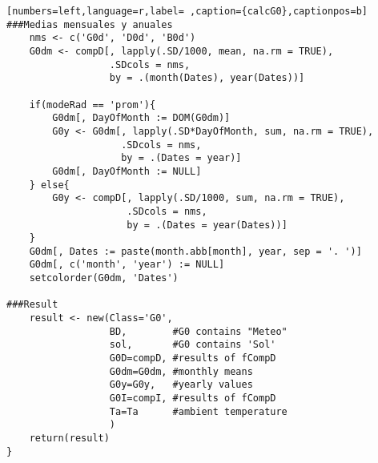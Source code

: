 \begin{lstlisting}[numbers=left,language=r,label= ,caption={calcG0},captionpos=b]
###Medias mensuales y anuales
    nms <- c('G0d', 'D0d', 'B0d')
    G0dm <- compD[, lapply(.SD/1000, mean, na.rm = TRUE),
                  .SDcols = nms,
                  by = .(month(Dates), year(Dates))]

    if(modeRad == 'prom'){
        G0dm[, DayOfMonth := DOM(G0dm)]
        G0y <- G0dm[, lapply(.SD*DayOfMonth, sum, na.rm = TRUE),
                    .SDcols = nms,
                    by = .(Dates = year)]
        G0dm[, DayOfMonth := NULL]        
    } else{
        G0y <- compD[, lapply(.SD/1000, sum, na.rm = TRUE),
                     .SDcols = nms,
                     by = .(Dates = year(Dates))]
    }
    G0dm[, Dates := paste(month.abb[month], year, sep = '. ')]
    G0dm[, c('month', 'year') := NULL]
    setcolorder(G0dm, 'Dates')

###Result
    result <- new(Class='G0',
                  BD,        #G0 contains "Meteo"
                  sol,       #G0 contains 'Sol'
                  G0D=compD, #results of fCompD
                  G0dm=G0dm, #monthly means
                  G0y=G0y,   #yearly values
                  G0I=compI, #results of fCompD
                  Ta=Ta      #ambient temperature
                  )
    return(result)
}
\end{lstlisting}
